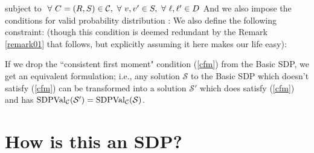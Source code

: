 \documentclass[12pt]{article}
\begin{document}
subject to $\ \forall \  C = (R, S) \in \mathcal{C},\ \forall \  v, v' \in S, \ \forall \  \ell, \ell' \in D $
And we also impose the conditions for valid probability distribution : 
We also define the following constraint: (though this condition is deemed redundant by the Remark \ref{remark01} that follows, but explicitly assuming it here makes our life easy): 

\begin{remark}\label{remark01}
If we drop the ``consistent first moment" condition (\ref{cfm}) from the Basic SDP, we get
an equivalent formulation; i.e., any solution $\mathcal{S}$ to the Basic SDP which doesn't satisfy  (\ref{cfm}) can be transformed into a solution $\mathcal{S}'$ which does satisfy  (\ref{cfm}) and has $\mbox{SDPVal}_{\mathcal{C}}(\mathcal{S}')
= \mbox{SDPVal}_{\mathcal{C}} (\mathcal{S})$.
\end{remark}

\section{How is this an SDP?}
\end{document}

